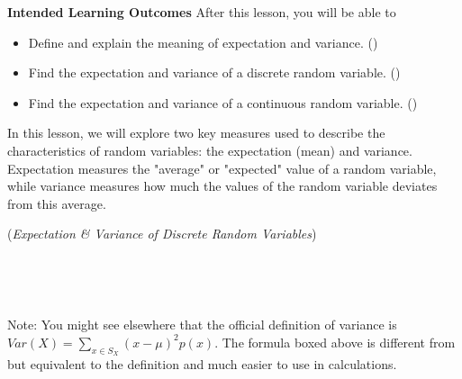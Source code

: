 \documentclass[10pt]{article}
\begin{document}
\thispagestyle{firstpage}
\pagestyle{otherpages}


\textbf{Intended Learning Outcomes}
After this lesson, you will be able to 

\begin{itemize}
    \item Define and explain the meaning of expectation and variance. ()
    \item Find the expectation and variance of a discrete random variable. ()
    \item Find the expectation and variance of a continuous random variable. ()
\end{itemize}

\vspace{-0.5cm}

\hrulefill

In this lesson, we will explore two key measures used to describe the characteristics of random variables: the expectation (mean) and variance. Expectation measures the "average" or "expected" value of a random variable, while variance measures how much the values of the random variable deviates from this average.

\begin{center}
({\it Expectation \& Variance of Discrete Random Variables})
\end{center}

\,\hfill{} \hfill\,

\,\hfill {}\hfill\,

Note: You might see elsewhere that the official definition of variance is $Var(X)=\displaystyle\sum_{x\in S_X}(x-\mu)^2p(x)$. The formula boxed above is different from but equivalent to the definition and much easier to use in calculations.
\medskip


\end{document}

